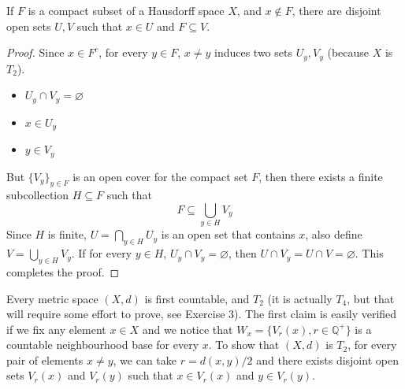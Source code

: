 \documentclass[../../main.tex]{subfiles}
\begin{document}
\begin{wts}
If $F$ is a compact subset of a Hausdorff space $X$, and $x\notin F$, there are disjoint open sets $U, V$ such that $x\in U$ and $F\subseteq V$.
\end{wts}
\begin{proof}
Since $x\in F^c$, for every $y\in F$, $x\neq y$ induces two sets $U_y, V_y$ (because $X$ is $T_2$).
\begin{itemize}
    \item $U_y\cap V_y=\varnothing$
    \item $x\in U_y$
    \item $y\in V_y$
\end{itemize}
But $\{V_y\}_{y\in F}$ is an open cover for the compact set $F$, then there exists a finite subcollection $H\subseteq F$ such that 
\[
F\subseteq \bigcup_{y\in H}V_y
\]
Since $H$ is finite, $U=\bigcap_{y\in H}U_y$ is an open set that contains $x$, also define $V = \bigcup_{y\in H}V_y$. If for every $y\in H$, $U_y\cap V_y=\varnothing$, then $U\cap V_y=U\cap V=\varnothing$. This completes the proof.
\end{proof}
\remark Every metric space $(X,d)$ is first countable, and $T_2$ (it is actually $T_4$, but that will require some effort to prove, see Exercise 3). The first claim is easily verified if we fix any element $x\in X$ and we notice that $W_x=\{V_{r}(x), r\in \mathbb{Q}^+\}$ is a countable neighbourhood base for every $x$. To show that $(X,d)$ is $T_2$, for every pair of elements $x\neq y$, we can take $r=d(x,y)/2$ and there exists disjoint open sets $V_r(x)$ and $V_r(y)$ such that $x\in V_r(x)$ and $y\in V_r(y)$.
\end{document}
